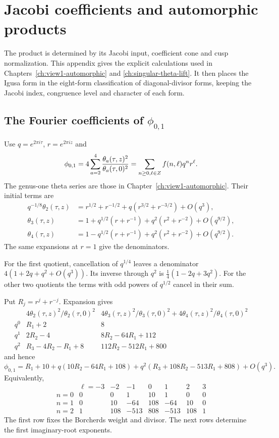 \section{Jacobi coefficients and automorphic products}
\label{app:borcherds-product-expansion}

The product is determined by its Jacobi input, coefficient cone and
cusp normalization.  This appendix gives the explicit calculations
used in Chapters~\ref{ch:view1-automorphic} and
\ref{ch:singular-theta-lift}.  It then places the Igusa form in the
eight-form classification of diagonal-divisor forms, keeping the
Jacobi index, congruence level and character of each form.

\subsection{The Fourier coefficients of
\texorpdfstring{\(\phi_{0,1}\)}{phi01}}

Use \(q=e^{2\pi i\tau}\), \(r=e^{2\pi iz}\) and
\[
 \phi_{0,1}
 =4\sum_{a=2}^4\frac{\theta_a(\tau,z)^2}{\theta_a(\tau,0)^2}
 =\sum_{n\geq0,\ell\in Z}f(n,\ell)q^nr^\ell.
\]
The genus-one theta series are those in
Chapter~\ref{ch:view1-automorphic}.
Their initial terms are
\[
\begin{aligned}
 q^{-1/8}\theta_2(\tau,z)
 &=r^{1/2}+r^{-1/2}
   +q(r^{3/2}+r^{-3/2})+O(q^3),\\
 \theta_3(\tau,z)
 &=1+q^{1/2}(r+r^{-1})+q^2(r^2+r^{-2})+O(q^{9/2}),\\
 \theta_4(\tau,z)
 &=1-q^{1/2}(r+r^{-1})+q^2(r^2+r^{-2})+O(q^{9/2}).
\end{aligned}
\]
The same expansions at \(r=1\) give the denominators.

For the first quotient, cancellation of \(q^{1/4}\) leaves
a denominator \(4(1+2q+q^2+O(q^3))\).
Its inverse through \(q^2\) is
\(\tfrac14(1-2q+3q^2)\).
For the other two quotients the terms with odd powers of
\(q^{1/2}\) cancel in their sum.

Put \(R_j=r^j+r^{-j}\).
Expansion gives
\[
\begin{array}{c|cc}
 &4\theta_2(\tau,z)^2/\theta_2(\tau,0)^2&
 4\theta_3(\tau,z)^2/\theta_3(\tau,0)^2+
 4\theta_4(\tau,z)^2/\theta_4(\tau,0)^2\\ \hline
 q^0&R_1+2&8\\
 q^1&2R_2-4&8R_2-64R_1+112\\
 q^2&R_3-4R_2-R_1+8&112R_2-512R_1+800
\end{array}
\]
and hence
\[
 \phi_{0,1}
 =R_1+10+q(10R_2-64R_1+108)
       +q^2(R_3+108R_2-513R_1+808)+O(q^3).
\]
Equivalently,
\[
\begin{array}{c|rrrrrrr}
 &\ell=-3&-2&-1&0&1&2&3\\ \hline
 n=0&0&0&1&10&1&0&0\\
 n=1&0&10&-64&108&-64&10&0\\
 n=2&1&108&-513&808&-513&108&1
\end{array}
\]
The first row fixes the Borcherds weight and divisor.
The next rows determine the first imaginary-root exponents.

